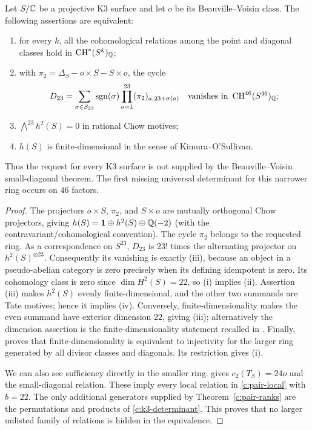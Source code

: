\begin{theorem}
\label{c:k3-gate}
Let $S/\mathbb C$ be a projective K3 surface and let $o$ be its Beauville--Voisin class. The following assertions are equivalent:
\begin{enumerate}[label=(\roman*)]
\item for every $k$, all the cohomological relations among the point and diagonal classes hold in $\operatorname{CH}^*(S^k)_\mathbb Q$;
\item with $\pi_2=\Delta_S-o\times S-S\times o$, the cycle
\begin{equation}
\label{c:k3-determinant}
 D_{23}=\sum_{\sigma\in S_{23}}\operatorname{sgn}(\sigma)
          \prod_{a=1}^{23}(\pi_2)_{a,23+\sigma(a)}
 \quad\text{vanishes in }\operatorname{CH}^{46}(S^{46})_\mathbb Q;
\end{equation}
\item $\bigwedge^{23}h^2(S)=0$ in rational Chow motives;
\item $h(S)$ is finite-dimensional in the sense of Kimura--O'Sullivan.
\end{enumerate}
Thus the request for every K3 surface is not supplied by the Beauville--Voisin small-diagonal theorem. The first missing universal determinant for this narrower ring occurs on $46$ factors.
\end{theorem}

\begin{proof}
The projectors $o\times S$, $\pi_2$, and $S\times o$ are mutually orthogonal Chow projectors, giving $h(S)=\mathbf1\oplus h^2(S)\oplus\mathbb Q(-2)$ (with the contravariant/cohomological convention). The cycle $\pi_2$ belongs to the requested ring. As a correspondence on $S^{23}$, $D_{23}$ is $23!$ times the alternating projector on $h^2(S)^{\otimes23}$. Consequently its vanishing is exactly (iii), because an object in a pseudo-abelian category is zero precisely when its defining idempotent is zero. Its cohomology class is zero since $\dim H^2(S)=22$, so (i) implies (ii). Assertion (iii) makes $h^2(S)$ evenly finite-dimensional, and the other two summands are Tate motives; hence it implies (iv). Conversely, finite-dimensionality makes the even summand have exterior dimension $22$, giving (iii); alternatively the dimension assertion is the finite-dimensionality statement recalled in \citet[\S2.4, p.~506]{c_yin2015}. Finally, \citet[unnumbered main Theorem, p.~503, and \S\S2.5, 3.1--3.6]{c_yin2015} proves that finite-dimensionality is equivalent to injectivity for the larger ring generated by all divisor classes and diagonals. Its restriction gives (i).

We can also see sufficiency directly in the smaller ring. \citet[Theorem 1 and Proposition 3.2]{c_beauvillevoisin2004} gives $c_2(T_S)=24o$ and the small-diagonal relation. These imply every local relation in \eqref{c:pair-local} with $b=22$. The only additional generators supplied by Theorem~\ref{c:pair-ranks} are the permutations and products of \eqref{c:k3-determinant}. This proves that no larger unlisted family of relations is hidden in the equivalence.
\end{proof}

